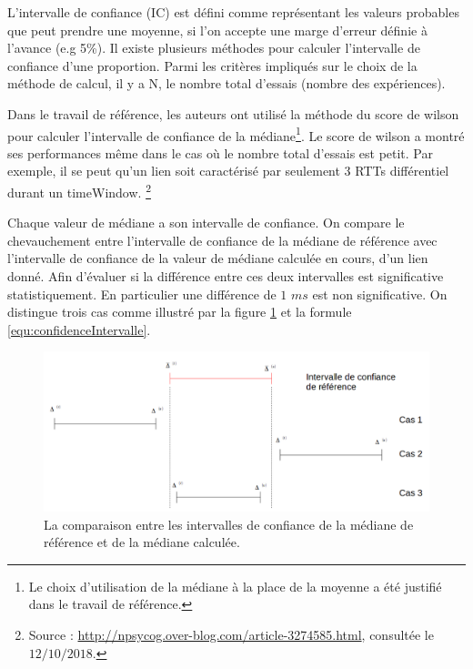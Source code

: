 L'intervalle de confiance (IC) est défini comme représentant les valeurs probables que peut prendre une moyenne, si l'on accepte une marge d'erreur définie à l'avance (e.g 5\%). Il existe plusieurs méthodes pour calculer l'intervalle de confiance d'une proportion. Parmi les critères impliqués sur le choix de la méthode de calcul, il y a N, le nombre total d'essais (nombre des expériences).

Dans le travail de référence, les auteurs ont utilisé la méthode du score de wilson pour calculer l'intervalle de confiance de la médiane\footnote{Le choix d'utilisation de la médiane à la place de la moyenne a été justifié dans le travail de référence.}.  Le score de wilson a montré ses performances même dans le cas où le nombre total d'essais est petit. Par exemple, il se peut qu'un lien soit caractérisé par seulement $ 3 $ RTTs différentiel durant un timeWindow. \footnote{Source : \url{http://npsycog.over-blog.com/article-3274585.html}, consultée le $ 12/10/2018 $.}

	 Chaque valeur de médiane a son intervalle de confiance. On compare le chevauchement entre l'intervalle de confiance de la médiane de référence avec l'intervalle de confiance de la valeur de médiane calculée en cours, d'un lien donné. Afin d'évaluer si la différence entre ces deux intervalles est significative statistiquement. En particulier une différence de $1$ $ms$ est non significative. On distingue trois cas comme illustré par la figure \ref{fig:illustration-cas-intervalles-deconfiance} et la formule \ref{equ:confidenceIntervalle}. 


\begin{figure}[H]
	\centering
	\includegraphics[width=1\linewidth]{illustrations/illustration-cas-intervalles-deconfiance}
	\caption{La comparaison entre les intervalles de confiance de la médiane de référence et de la médiane calculée.}
	\label{fig:illustration-cas-intervalles-deconfiance}
\end{figure}

